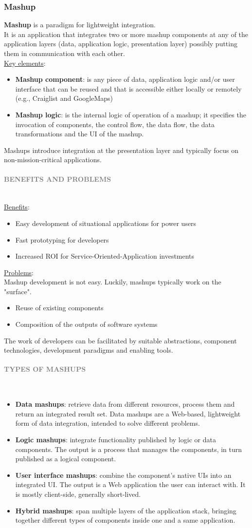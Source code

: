 \documentclass[10pt,a4paper]{article}
\newcommand{\myparagraph}[1]{\paragraph{\normalsize{\textcolor{gray}{\uppercase{\textbf{#1}}}} }\mbox{} \vspace{0.5em}\\}
\begin{document}
\subsubsection{Mashup}
\textbf{Mashup} is a paradigm for lightweight integration. \\
It is an application that integrates two or more mashup components at any of the application layers (data, application logic, presentation layer) possibly putting them in communication with each other. \\
\uline{Key elements}:
\begin{itemize}
	\item \textbf{Mashup component}: is any piece of data, application logic and/or user interface that can be reused and that is accessible either locally or remotely (e.g., Craiglist and GoogleMaps)
	\item \textbf{Mashup logic}: is the internal logic of operation of a mashup; it specifies the invocation of components, the control flow, the data flow, the data transformations and the UI of the mashup.
\end{itemize}
Mashups introduce integration at the presentation layer and typically focus on non-mission-critical applications. 
\myparagraph{Benefits and Problems}
\uline{Benefits}:
\begin{itemize}
	\item Easy development of situational applications for power users
	\item Fast prototyping for developers
	\item Increased ROI for Service-Oriented-Application investments
\end{itemize}
\uline{Problems}: \\
Mashup development is not easy. Luckily, mashups typically work on the "surface".
\begin{itemize}
	\item Reuse of existing components
	\item Composition of the outputs of software systems
\end{itemize}
The work of developers can be facilitated by suitable abstractions, component technologies, development paradigms and enabling tools. 
\myparagraph{Types of Mashups}
\begin{itemize}
	\item \textbf{Data mashups}: retrieve data from different resources, process them and return an integrated result set. Data mashups are a Web-based, lightweight form of data integration, intended to solve different problems.
	\item \textbf{Logic mashups}: integrate functionality published by logic or data components. The output is a process that manages the components, in turn published as a logical component.
	\item \textbf{User interface mashups}: combine the component’s native UIs into an integrated UI. The output is a Web application the user can interact with. It is mostly client-side, generally short-lived.
	\item \textbf{Hybrid mashups}: span multiple layers of the application stack, bringing together different types of components inside one and a same application.
\end{itemize}
\end{document}
